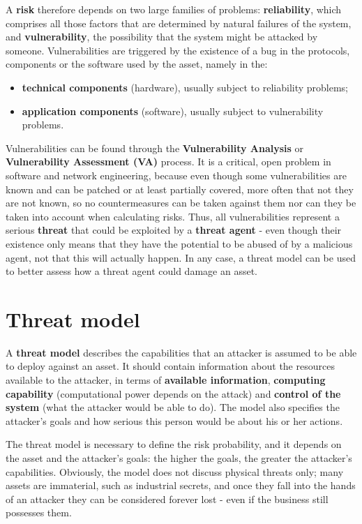 A \textbf{risk} therefore depends on two large families of problems: \textbf{reliability}, which comprises all those factors that are determined by natural failures of the system, and \textbf{vulnerability}, the possibility that the system might be attacked by someone. Vulnerabilities are triggered by the existence of a bug in the protocols, components or the software used by the asset, namely in the:

\begin{itemize}
    \item \textbf{technical components} (hardware), usually subject to reliability problems;
    \item \textbf{application components} (software), usually subject to vulnerability problems.
\end{itemize}

Vulnerabilities can be found through the \textbf{Vulnerability Analysis} or \textbf{Vulnerability Assessment (VA)} process. It is a critical, open problem in software and network engineering, because even though some vulnerabilities are known and can be patched or at least partially covered, more often that not they are not known, so no countermeasures can be taken against them nor can they be taken into account when calculating risks. Thus, all vulnerabilities represent a serious \textbf{threat} that could be exploited by a \textbf{threat agent} - even though their existence only means that they have the potential to be abused of by a malicious agent, not that this will actually happen. In any case, a threat model can be used to better assess how a threat agent could damage an asset.


\section{Threat model}
A \textbf{threat model} describes the capabilities that an attacker is assumed to be able to deploy against an asset. It should contain information about the resources available to the attacker, in terms of \textbf{available information}, \textbf{computing capability} (computational power depends on the attack) and \textbf{control of the system} (what the attacker would be able to do). The model also specifies the attacker's goals and how serious this person would be about his or her actions.

The threat model is necessary to define the risk probability, and it depends on the asset and the attacker's goals: the higher the goals, the greater the attacker's capabilities. Obviously, the model does not discuss physical threats only; many assets are immaterial, such as industrial secrets, and once they fall into the hands of an attacker they can be considered forever lost - even if the business still possesses them.

